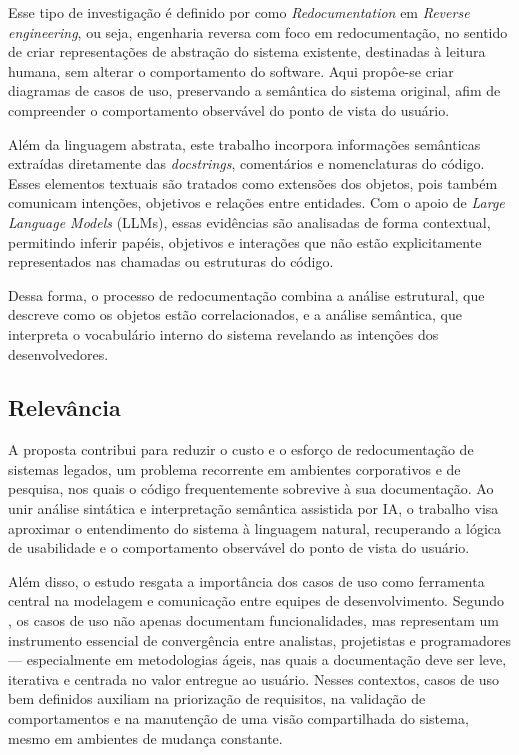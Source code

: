 \documentclass[12pt,a4paper]{article}
\begin{document}
Esse tipo de investigação é definido por \textcite{chikofsky1990reverse} como \textit{Redocumentation} em \textit{Reverse engineering}, ou seja, engenharia reversa com foco em redocumentação, no sentido de criar representações de abstração do sistema existente, destinadas à leitura humana, sem alterar o comportamento do software. Aqui propôe-se criar diagramas de casos de uso, preservando a semântica do sistema original, afim de compreender o comportamento observável do ponto de vista do usuário.

Além da linguagem abstrata, este trabalho incorpora informações semânticas extraídas diretamente das \textit{docstrings}, comentários e nomenclaturas do código. Esses elementos textuais são tratados como extensões dos objetos, pois também comunicam intenções, objetivos e relações entre entidades. Com o apoio de \textit{Large Language Models} (LLMs), essas evidências são analisadas de forma contextual, permitindo inferir papéis, objetivos e interações que não estão explicitamente representados nas chamadas ou estruturas do código.

Dessa forma, o processo de redocumentação combina a análise estrutural, que descreve como os objetos estão correlacionados, e a análise semântica, que interpreta o vocabulário interno do sistema revelando as intenções dos desenvolvedores. 

\subsection{Relevância}

A proposta contribui para reduzir o custo e o esforço de redocumentação de sistemas legados, um problema recorrente em ambientes corporativos e de pesquisa, nos quais o código frequentemente sobrevive à sua documentação. Ao unir análise sintática e interpretação semântica assistida por IA, o trabalho visa aproximar o entendimento do sistema à linguagem natural, recuperando a lógica de usabilidade e o comportamento observável do ponto de vista do usuário.

Além disso, o estudo resgata a importância dos casos de uso como ferramenta central na modelagem e comunicação entre equipes de desenvolvimento. Segundo \textcite{larman2002applying}, os casos de uso não apenas documentam funcionalidades, mas representam um instrumento essencial de convergência entre analistas, projetistas e programadores — especialmente em metodologias ágeis, nas quais a documentação deve ser leve, iterativa e centrada no valor entregue ao usuário. Nesses contextos, casos de uso bem definidos auxiliam na priorização de requisitos, na validação de comportamentos e na manutenção de uma visão compartilhada do sistema, mesmo em ambientes de mudança constante.
\end{document}
